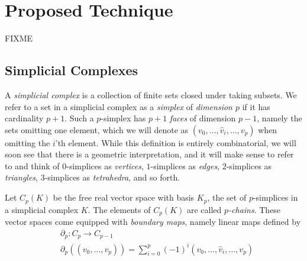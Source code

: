 \section{Proposed Technique}
FIXME

\subsection{Simplicial  Complexes}
A \emph{simplicial complex} is a collection of finite sets closed under taking subsets. We refer to a set in a simplicial complex as a \emph{simplex} of \emph{dimension $p$} if it has cardinality $p+1$. Such a $p$-simplex has $p+1$ \emph{faces} of dimension $p-1$, namely the sets omitting one element, which we will denote as $(v_0,\dotsc,\hat{v}_i,\dotsc, v_p)$ when omitting the $i$'th element. While this definition is entirely combinatorial, we will soon see that there is a geometric interpretation, and it will make sense to refer to and think of $0$-simplices as \emph{vertices}, $1$-simplices as \emph{edges}, $2$-simplices as \emph{triangles}, $3$-simplices as \emph{tetrahedra}, and so forth.

Let $C_p(K)$ be the free real vector space with basis $K_p$, the set of $p$-simplices in a simplicial complex $K$. The elements of $C_p(K)$ are called \emph{$p$-chains}. These vector spaces come equipped with \emph{boundary maps}, namely linear maps defined by
\begin{align*}
  &\partial_p:C_p\to C_{p-1} \\
  &\partial_p((v_0,\dotsc,v_p)) = \sum_{i=0}^p (-1)^i(v_0,\dotsc,\hat{v}_i,\dotsc,v_p)
\end{align*}

  

